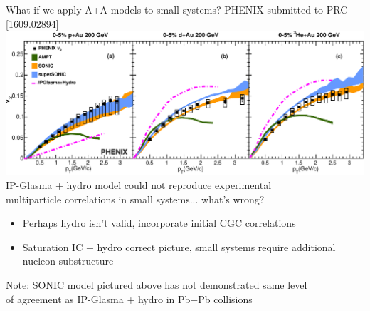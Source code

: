 \documentclass{beamer}
\begin{document}
\begin{frame}{What if we apply A+A models to small systems?}
  \centering
  {\tiny PHENIX submitted to PRC [1609.02894]} \\
  \includegraphics[width=.85\columnwidth]{phenix_models} \\[1ex]
  \small IP-Glasma + hydro model could not reproduce experimental\\multiparticle correlations in small systems... what's wrong? \\[1ex]
  \begin{itemize}
    \item<1> Perhaps hydro isn't valid, incorporate initial CGC correlations
    \item<1-2> Saturation IC + hydro correct picture, small systems require additional nucleon substructure
  \end{itemize}
  \scriptsize Note: SONIC model pictured above has not demonstrated same level\\
  of agreement as IP-Glasma + hydro in Pb+Pb collisions
\end{frame}
\end{document}
